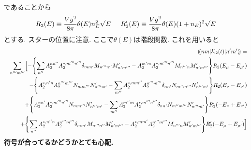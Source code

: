 \documentclass[10.5pt,a4paper]{jreport}
\newcommand{\dpbra}[1]{( \! ( #1 |}
\newcommand{\dpket}[1]{| #1 ) \! )}
\newcommand{\calK}{{\cal K}}
\begin{document}
であることから
\begin{eqnarray}
  R_2(E) \equiv \frac{Vg^2}{8\pi}\theta(E)n_E^2\sqrt{E}\hspace{0.5cm}R_2'(E) \equiv \frac{Vg^2}{8\pi}\theta(E)(1 + n_E)^2\sqrt{E}
\end{eqnarray}
とする. スターの位置に注意. ここで$\theta(E)$は階段関数. これを用いると
\begin{eqnarray}
  \nonumber &&\dpbra{nm}\calK_2(t)\dpket{n'm'} =\\
  \nonumber &&\sum_{n'''m'''}\Bigl[-\Bqty{\sum_{n''}A_2^{nn''}A_2^{*, m'''n'''}\delta_{mm'}M_{n'''n''}M_{n'm'''}' - A_2^{m'm}A_2^{*, m'''n'''}M_{n'''n}M_{n'm'''}'}R_2(E_\mu - E_{\mu'})\\
    \nonumber &&- \Bqty{A_2^{*, n'n}A_2^{n'''m'''}N_{mm'''}N_{n'''m'}' - \sum_{m''}A_2^{*, mm''}A_2^{n'''m'''}\delta_{nn'}N_{m''m'''}N_{n'''m'}'}R_2(E_\nu - E_{\nu'})\\
    \nonumber &&+ \Bqty{A_2^{nn'}A_2^{*, m'''n'''}N_{mm'''}N_{n'''m'}' - \sum_{m''}A_2^{m''m}A_2^{*, m'''n'''}\delta_{nn'}N_{m''m'''}N_{n'''m'}'}R_2'(-E_\nu + E_{\nu'})\\
   \nonumber&&+\Bqty{\sum_{n''}A_2^{*, n''n}A_2^{n'''m'''}\delta_{mm'}M_{n'''n''}M_{n'm'''}' - A_2^{*, mm'}A_2^{n'''m'''}M_{n'''n}M_{n'm'''}'}R_2'(- E_\mu + E_{\mu'})\Bigr]\\\label{K1}
\end{eqnarray}
\textbf{符号が合ってるかどうかとても心配.}
\end{document}
